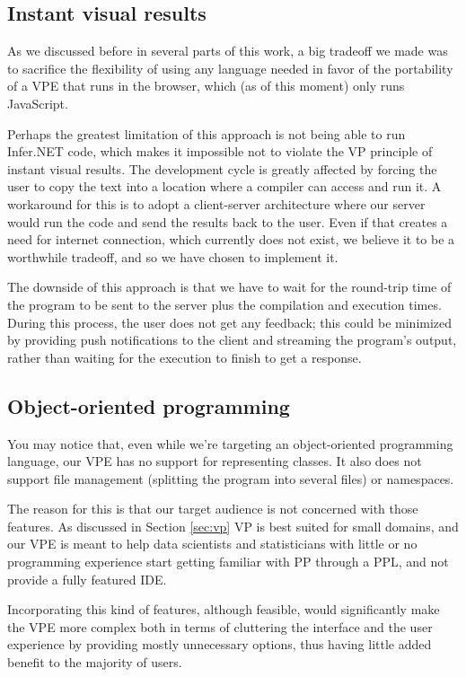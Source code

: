 \subsection{Instant visual results}

As we discussed before in several parts of this work, a big tradeoff we made was
to sacrifice the flexibility of using any language needed in favor of the portability
of a VPE that runs in the browser, which (as of this moment) only runs JavaScript.

Perhaps the greatest limitation of this approach is not being able to run Infer.NET
code, which makes it impossible not to violate the VP principle of instant visual results.
The development cycle is greatly affected by forcing the user to copy the text
into a location where a compiler can access and run it. A workaround for this
is to adopt a client-server architecture where our server would run the code
and send the results back to the user. Even if that creates a need for internet
connection, which currently does not exist, we believe it to be a worthwhile tradeoff,
and so we have chosen to implement it.

The downside of this approach is that we have to wait for the round-trip time
of the program to be sent to the server plus the compilation and execution times.
During this process, the user does not get any feedback; this could be minimized
by providing push notifications to the client and streaming the program's output,
rather than waiting for the execution to finish to get a response.

\subsection{Object-oriented programming}

You may notice that, even while we're targeting an object-oriented programming
language, our VPE has no support for representing classes. It also does not
support file management (splitting the program into several files) or namespaces.

The reason for this is that our target audience is not concerned with those features.
As discussed in Section \ref{sec:vp} VP is best suited for small domains, and our
VPE is meant to help data scientists and statisticians with little or no programming
experience start getting familiar with PP through a PPL, and not provide a
fully featured IDE.

Incorporating this kind of features, although feasible, would significantly
make the VPE more complex both in terms of cluttering the interface and the user
experience by providing mostly unnecessary options, thus having little added
benefit to the majority of users.

